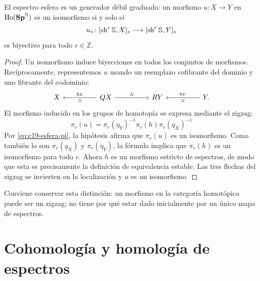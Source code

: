 \begin{prop}\label{prop:c19-generador}
El espectro esfera es un generador débil graduado: un morfismo $u\colon X\to Y$ en $\operatorname{Ho}(\mathbf{Sp}^{\mathbb N})$ es un isomorfismo si y solo si
\[
u_*\colon[\operatorname{sh}^r\mathbb S,X]_s\longrightarrow[\operatorname{sh}^r\mathbb S,Y]_s
\]
es biyectivo para todo $r\in\mathbb Z$.
\end{prop}
\begin{proof}
Un isomorfismo induce biyecciones en todos los conjuntos de morfismos. Recíprocamente, representemos $u$ usando un reemplazo cofibrante del dominio y uno fibrante del codominio:
\[
\begin{tikzcd}[column sep=huge]
X&QX\arrow[l,"q_X"',"\simeq"]\arrow[r,"h"]
&RY&Y\arrow[l,"\eta_Y"',"\simeq"] .
\end{tikzcd}
\]
El morfismo inducido en los grupos de homotopía se expresa mediante el zigzag:
\[
\pi_r(u)=\pi_r(\eta_Y)^{-1}\pi_r(h)\pi_r(q_X)^{-1}
\]
Por \eqref{eq:c19-esfera-pi}, la hipótesis afirma que $\pi_r(u)$ es un isomorfismo. Como también lo son $\pi_r(q_X)$ y $\pi_r(\eta_Y)$, la fórmula implica que $\pi_r(h)$ es un isomorfismo para todo $r$. Ahora $h$ es un morfismo estricto de espectros, de modo que esta es precisamente la definición de equivalencia estable. Las tres flechas del zigzag se invierten en la localización y $u$ es un isomorfismo.
\end{proof}
Conviene conservar esta distinción: un morfismo en la categoría homotópica puede ser un zigzag; no tiene por qué estar dado inicialmente por un único mapa de espectros.

\section{Cohomología y homología de espectros}

